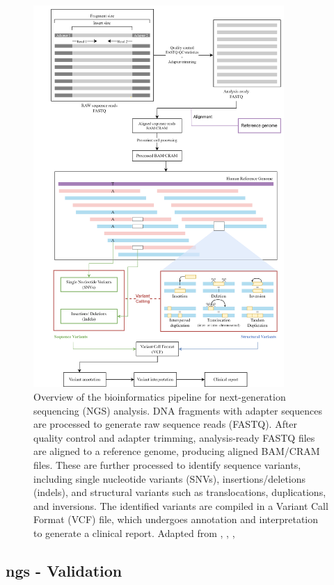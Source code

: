 \begin{figure}[H]
    \centering
    \includegraphics[width=0.85\textwidth]{figs/pipeline.png}
    \caption{Overview of the bioinformatics pipeline for next-generation sequencing (NGS) analysis. DNA fragments with adapter sequences are processed to generate raw sequence reads (FASTQ). After quality control and adapter trimming, analysis-ready FASTQ files are aligned to a reference genome, producing aligned BAM/CRAM files. These are further processed to identify sequence variants, including single nucleotide variants (SNVs), insertions/deletions (indels), and structural variants such as translocations, duplications, and inversions. The identified variants are compiled in a Variant Call Format (VCF) file, which undergoes annotation and interpretation to generate a clinical report. Adapted from \cite{Roy2018}, \cite{pipeline}, \cite{Roy2020}, \cite{Kanzi2020}} 
    \label{fig:pipeline}
\end{figure}

\subsection{\acl{ngs} - Validation} \label{subsec:ngs_bioinformatics}

